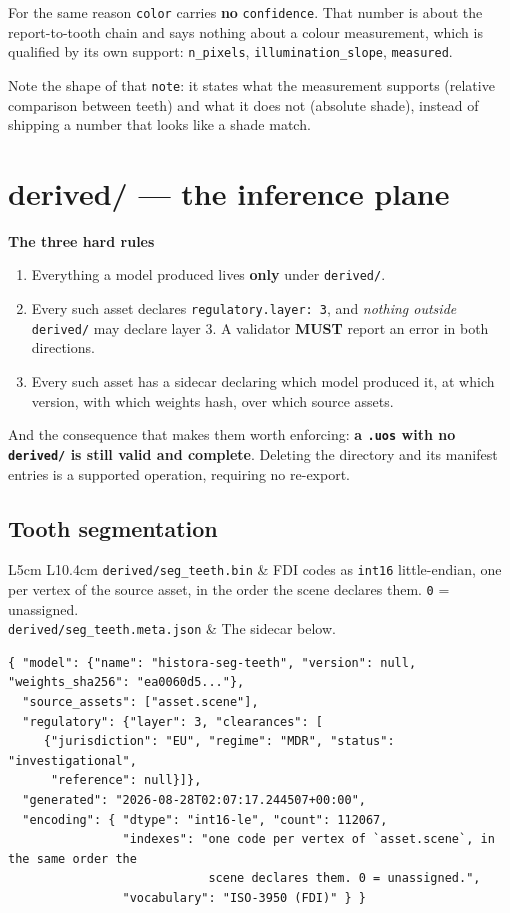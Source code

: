 \documentclass[11pt,a4paper]{article}
\newcommand{\MUST}{\textcolor{uosred}{\textbf{MUST}}}
\newcommand{\code}[1]{\texttt{\small #1}}
\begin{document}
For the same reason \code{color} carries \textbf{no} \code{confidence}. That number is
about the report-to-tooth chain and says nothing about a colour measurement, which is
qualified by its own support: \code{n\_pixels}, \code{illumination\_slope},
\code{measured}.

Note the shape of that \code{note}: it states what the measurement supports (relative
comparison between teeth) and what it does not (absolute shade), instead of shipping a
number that looks like a shade match.

\section{{derived/} --- the inference plane}\label{sec:derived}

\textbf{The three hard rules}
\begin{enumerate}
  \item Everything a model produced lives \textbf{only} under \code{derived/}.
  \item Every such asset declares \code{regulatory.layer: 3}, and \emph{nothing outside}
  \code{derived/} may declare layer 3. A validator \MUST{} report an error in both
  directions.
  \item Every such asset has a sidecar declaring which model produced it, at which version,
  with which weights hash, over which source assets.
\end{enumerate}
And the consequence that makes them worth enforcing: \textbf{a \code{.uos} with no
\code{derived/} is still valid and complete}. Deleting the directory and its manifest
entries is a supported operation, requiring no re-export.

\subsection{Tooth segmentation}

\begin{longtable}{L{5cm} L{10.4cm}}
\toprule
\code{derived/seg\_teeth.bin} & FDI codes as \code{int16} little-endian, one per vertex of
the source asset, in the order the scene declares them. \code{0} = unassigned.\\
\code{derived/seg\_teeth.meta.json} & The sidecar below.\\
\bottomrule
\end{longtable}

\begin{lstlisting}[style=js]
{ "model": {"name": "histora-seg-teeth", "version": null, "weights_sha256": "ea0060d5..."},
  "source_assets": ["asset.scene"],
  "regulatory": {"layer": 3, "clearances": [
     {"jurisdiction": "EU", "regime": "MDR", "status": "investigational",
      "reference": null}]},
  "generated": "2026-08-28T02:07:17.244507+00:00",
  "encoding": { "dtype": "int16-le", "count": 112067,
                "indexes": "one code per vertex of `asset.scene`, in the same order the
                            scene declares them. 0 = unassigned.",
                "vocabulary": "ISO-3950 (FDI)" } }
\end{lstlisting}
\end{document}
